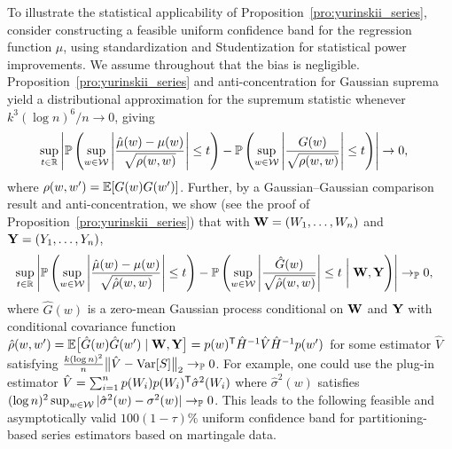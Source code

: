 To illustrate the statistical applicability of
Proposition~\ref{pro:yurinskii_series}, consider constructing a feasible uniform
confidence band for the regression function $\mu$, using standardization and
Studentization for statistical power improvements. We assume throughout that
the bias is negligible. Proposition~\ref{pro:yurinskii_series} and
anti-concentration for
Gaussian suprema \citep[Corollary~2.1]{chernozhukov2014anti} yield
a distributional approximation for the supremum statistic whenever
$k^3(\log n)^6 / n \to 0$, giving
%
\begin{align*}
  \sup_{t \in \mathbb{R}}
  \left|
  \mathbb{P}\left(
    \sup_{w \in \mathcal{W}}
    \left|
    \frac{\hat\mu(w)-\mu(w)}{\sqrt{\rho(w,w)}}
    \right| \leq t
  \right)
  -
  \mathbb{P}\left(
    \sup_{w \in \mathcal{W}}
    \left|
    \frac{G(w)}{\sqrt{\rho(w,w)}}
    \right| \leq t
  \right)
  \right|
  &\to 0,
\end{align*}
%
where $\rho(w,w') = \mathbb{E}[G(w)G(w')]$. Further, by a Gaussian--Gaussian
comparison result \citep[Lemma~3.1]{chernozhukov2013gaussian} and
anti-concentration, we show (see the proof of
Proposition~\ref{pro:yurinskii_series}) that with $\mathbf{W} = (W_1, \ldots, W_n)$ and
$\mathbf{Y} = (Y_1, \ldots, Y_n)$,
%
\begin{align*}
  \sup_{t \in \mathbb{R}}
  \left|
  \mathbb{P}\left(
    \sup_{w \in \mathcal{W}}
    \left|
    \frac{\hat\mu(w)-\mu(w)}{\sqrt{\hat\rho(w,w)}}
    \right| \leq t
  \right)
  - \mathbb{P}\left(
    \sup_{w \in \mathcal{W}}
    \left|
    \frac{\hat G(w)}{\sqrt{\hat\rho(w,w)}}
    \right| \leq t \biggm| \mathbf{W}, \mathbf{Y}
  \right)
  \right|
  &\to_{\mathbb{P}} 0,
\end{align*}
%
where $\hat G(w)$ is a zero-mean Gaussian process
conditional on $\mathbf{W}$ and $\mathbf{Y}$ with conditional covariance function
$\hat\rho(w,w')
=\mathbb{E}\big[\hat G(w) \hat G(w') \mid \mathbf{W}, \mathbf{Y} \big]
= p(w)^{\mathsf{T}} \hat H^{-1} \hat V \hat H^{-1}p(w')$
for some estimator $\hat V$ satisfying
$\frac{k (\log n)^2}{n}
\big\|\hat V-\operatorname{Var}[S]\big\|_2 \to_{\mathbb{P}} 0$.
For example, one could use the plug-in estimator
$\hat V=\sum_{i=1}^n p(W_i) p(W_i)^{\mathsf{T}} \hat{\sigma}^2(W_i)$
where $\hat{\sigma}^2(w)$ satisfies
$(\log n)^2 \sup_{w \in \mathcal{W}}
|\hat{\sigma}^2(w)-\sigma^2(w)| \to_{\mathbb{P}} 0$.
This leads to the following feasible and asymptotically valid
$100(1-\tau)\%$
uniform confidence band for partitioning-based series estimators
based on martingale data.

